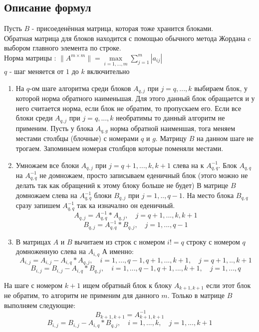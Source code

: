 \documentclass[a4paper,12pt]{article}
\begin{document}
\subsection{Описание формул}
Пусть $B$ - присоеденённая матрица, которая тоже хранится блоками.\\
Обратная матрица для блоков находится с помощью обычного метода Жордана c выбором главного
элемента по строке.\\
Норма матрицы : 
$\|A^{m \times m} \| = \max\limits_{i = 1,\ldots,m} \sum\limits_{j = 1}^m |a_{ij}|$\\
$q$ - шаг меняется от $1$ до $k$ включительно

\begin{enumerate}
    \item На $q$-ом шаге алгоритма среди блоков $A_{q,j}$ при $j = q,...,k$ выбираем блок,
        у которой норма обратного наименьшая. Для этого данный блок обращается и у него
        считается норма, если блок не обратим, то пропускаем его.
        Если все блоки среди $A_{q,j}$ при $j = q,...,k$ необратимы то данный алгоритм не применим.
        Пусть у блока $A_{q, g}$ норма обратной наименшая, тога меняем местами столбцы
        (блочные) с номерами 
        $q$ и $g$. Матрицу $B$ на данном шаге не трогаем. Запоминаем номерая столбцов которые
        поменяли местами.
    \item Умножаем все блоки $A_{q, j}$ при $j = q + 1,...,k, k + 1$ слева на к $A_{q, q}^{-1}$.
        Блок $A_{q,q}$ на $A_{q, q}^{-1}$ не домножаем, просто записываем еденичный блок
        (этого можно не делать так как обращений к этому блоку больше не будет)
        В матрице $B$ домножаем слева на $A_{q, q}^{-1}$ блоки $B_{q, j}$ при 
        $j = 1,..,q-1$.
        На место блока $B_{q,q}$ сразу запишем $A_{q,q}^{-1}$ так ка изначално он еденичный.
        $$A_{q, j} = A_{q, q}^{-1} * A_{q, j}, \quad j = q + 1,...,k, k + 1$$ 
        $$B_{q, j} = A_{q, q}^{-1} * B_{q, j}, \quad j = 1,...,q-1$$ 
    \item В матрицах $A$ и $B$ вычитаем из строк с номером $i != q$ строку с номером $q$ 
        домноженную слева на $A_{i, q}$ 
        А именно: 
        $$A_{i, j} = A_{i, j} - A_{i, q} * A_{q, j}, \quad i = 1,...,q-1,q+1,...,k+1,
        \quad j = q + 1,..,k+1$$
        $$B_{i, j} = B_{i, j} - A_{i, q} * B_{q, j}, \quad i = 1,...,q-1,q+1,...,k+1,
        \quad j = 1,...,q$$
\end{enumerate}
На шаге с номером $k + 1$ ищем обратный блок к блоку $A_{k+1,k+1}$ если этот блок не обратим,
то алгоритм не применим для данного $m$. Только в матрице $B$ выполняем следующие:
$$B_{k+1,k+1} = A_{k+1,k+1}^{-1}$$
$$B_{i,j} = B_{i,j} - A_{i,q} * B_{q,j}, \quad i = 1,...,k, \quad j = 1,...,k+1$$
\end{document}
